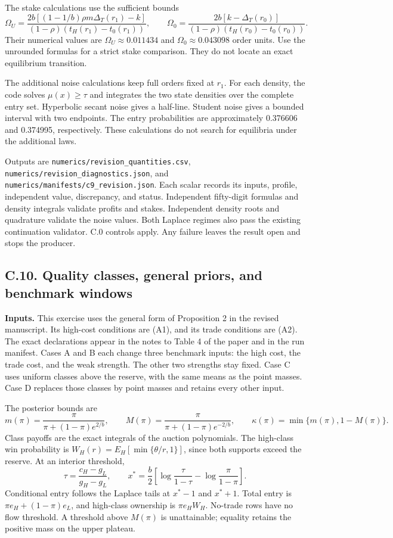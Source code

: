 \documentclass[
  11pt,
]{article}
\begin{document}
The stake calculations use the sufficient bounds \[
\Omega_U=\frac{2b[(1-1/b)\rho m\Delta_T(r_1)-k]}{(1-\rho)(t_H(r_1)-t_0(r_1))},
\qquad
\Omega_0=\frac{2b[k-\Delta_T(r_0)]}{(1-\rho)(t_H(r_0)-t_0(r_0))}.
\] Their numerical values are \(\Omega_U\approx0.011434\) and
\(\Omega_0\approx0.043098\) order units. Use the unrounded formulas for
a strict stake comparison. They do not locate an exact equilibrium
transition.

The additional noise calculations keep full orders fixed at \(r_1\). For
each density, the code solves \(\mu(x)\ge\tau\) and integrates the two
state densities over the complete entry set. Hyperbolic secant noise
gives a half-line. Student noise gives a bounded interval with two
endpoints. The entry probabilities are approximately 0.376606 and
0.374995, respectively. These calculations do not search for equilibria
under the additional laws.

Outputs are \texttt{numerics/revision\_quantities.csv},
\texttt{numerics/revision\_diagnostics.json}, and
\texttt{numerics/manifests/c9\_revision.json}. Each scalar records its
inputs, profile, independent value, discrepancy, and status. Independent
fifty-digit formulas and density integrals validate profits and stakes.
Independent density roots and quadrature validate the noise values. Both
Laplace regimes also pass the existing continuation validator. C.0
controls apply. Any failure leaves the result open and stops the
producer.

\subsection{C.10. Quality classes, general priors, and benchmark
windows}\label{oa-c-classes}

\textbf{Inputs.} This exercise uses the general form of Proposition 2 in
the revised manuscript. Its high-cost conditions are (A1), and its trade
conditions are (A2). The exact declarations appear in the notes to Table
4 of the paper and in the run manifest. Cases A and B each change three
benchmark inputs: the high cost, the trade cost, and the weak strength.
The other two strengths stay fixed. Case C uses uniform classes above
the reserve, with the same means as the point masses. Case D replaces
those classes by point masses and retains every other input.

The posterior bounds are \[
m(\pi)=\frac{\pi}{\pi+(1-\pi)e^{2/b}},\qquad
M(\pi)=\frac{\pi}{\pi+(1-\pi)e^{-2/b}},\qquad
\kappa(\pi)=\min\{m(\pi),1-M(\pi)\}.
\] Class payoffs are the exact integrals of the auction polynomials. The
high-class win probability is \(W_H(r)=E_H[\min\{\theta/r,1\}]\), since
both supports exceed the reserve. At an interior threshold, \[
\tau=\frac{c_H-g_L}{g_H-g_L},\qquad
x^*=\frac b2\left[\log\frac{\tau}{1-\tau}-\log\frac{\pi}{1-\pi}\right].
\] Conditional entry follows the Laplace tails at \(x^*-1\) and
\(x^*+1\). Total entry is \(\pi e_H+(1-\pi)e_L\), and high-class
ownership is \(\pi e_HW_H\). No-trade rows have no flow threshold. A
threshold above \(M(\pi)\) is unattainable; equality retains the
positive mass on the upper plateau.
\end{document}
